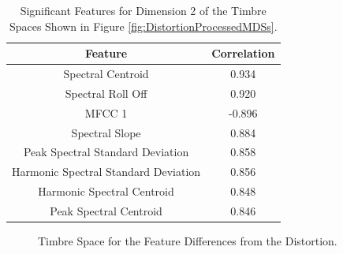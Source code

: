 	\begin{table}[h!]
		\centering
		\begin{tabular}{|c|c|}
			\hline
			\bf{Feature} & \bf{Correlation} \\
			\hline
			\hline
			Spectral Centroid &  0.934 \\
			\hline
			Spectral Roll Off &  0.920 \\
			\hline
			MFCC 1 & -0.896 \\
			\hline
			Spectral Slope &  0.884 \\
			\hline
			Peak Spectral Standard Deviation &  0.858 \\
			\hline
			Harmonic Spectral Standard Deviation &  0.856 \\
			\hline
			Harmonic Spectral Centroid &  0.848 \\
			\hline
			Peak Spectral Centroid &  0.846 \\
			\hline
		\end{tabular}
		\caption{Significant Features for Dimension 2 of the Timbre Spaces Shown in Figure 
			 \ref{fig:DistortionProcessedMDSs}.}
		\label{tab:DistortionProcessedFeaturesDim2}
	\end{table}

	\begin{figure}[h!]
		\centering
		\qquad
		\caption{Timbre Space for the Feature Differences from the Distortion.}
		\label{fig:DistortionDifferenceMDSs}
	\end{figure}


